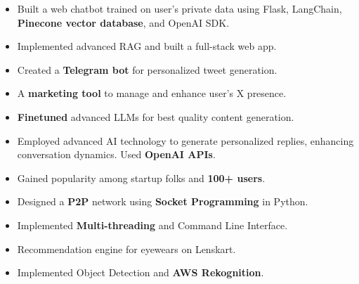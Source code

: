 \documentclass[10pt,a4paper,ragged2e,withhyper]{altacv}
\begin{document}
\begin{paracol}{2}
\divider\smallskip

\begin{itemize}
    \item Built a web chatbot trained on user's private data using Flask, LangChain, \textbf{Pinecone vector database}, and OpenAI SDK.
    \item Implemented advanced RAG and built a full-stack web app.
\end{itemize}

\divider\smallskip

\begin{itemize}
    \item Created a \textbf{Telegram bot} for personalized tweet generation.
    \item A \textbf{marketing tool} to manage and enhance user's X presence.
    \item \textbf{Finetuned} advanced LLMs for best quality content generation.
\end{itemize}

\divider\smallskip

\begin{itemize}
    \item Employed advanced AI technology to generate personalized replies, enhancing conversation dynamics. Used \textbf{OpenAI APIs}.
    \item Gained popularity among startup folks and \textbf{100+ users}.
\end{itemize}

\divider\smallskip

\begin{itemize}
    \item Designed a \textbf{P2P} network using \textbf{Socket Programming} in Python.
    \item Implemented \textbf{Multi-threading} and Command Line Interface.
\end{itemize}

\divider\smallskip

\begin{itemize}
    \item Recommendation engine for eyewears on Lenskart.
    \item Implemented Object Detection and \textbf{AWS Rekognition}.
\end{itemize}


\end{paracol}
\end{document}
